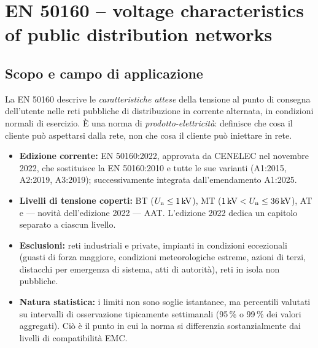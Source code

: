\chapter{EN 50160 -- voltage characteristics of public distribution networks}
\label{ch:en50160}
\begin{center}
\end{center}

\vspace{4mm}

\section{Scopo e campo di applicazione}

La EN 50160 descrive le \emph{caratteristiche attese} della tensione al punto di
consegna dell'utente nelle reti pubbliche di distribuzione in corrente alternata,
in condizioni normali di esercizio. È una norma di \emph{prodotto-elettricità}:
definisce che cosa il cliente può aspettarsi dalla rete, non che cosa il cliente
può iniettare in rete.

\begin{itemize}[itemsep=2pt]
  \item \textbf{Edizione corrente:} EN 50160:2022, approvata da CENELEC nel novembre 2022,
        che sostituisce la EN 50160:2010 e tutte le sue varianti
        (A1:2015, A2:2019, A3:2019); successivamente integrata dall'emendamento A1:2025.
  \item \textbf{Livelli di tensione coperti:} BT ($U_{\mathrm{n}} \le \SI{1}{kV}$),
        MT ($\SI{1}{kV} < U_{\mathrm{n}} \le \SI{36}{kV}$), AT e --- novità dell'edizione 2022 ---
        AAT. L'edizione 2022 dedica un capitolo separato a ciascun livello.
  \item \textbf{Esclusioni:} reti industriali e private, impianti in condizioni eccezionali
        (guasti di forza maggiore, condizioni meteorologiche estreme, azioni di terzi,
        distacchi per emergenza di sistema, atti di autorità), reti in isola non pubbliche.
  \item \textbf{Natura statistica:} i limiti non sono soglie istantanee, ma percentili
        valutati su intervalli di osservazione tipicamente settimanali
        (95\,\% o 99\,\% dei valori aggregati). Ciò è il punto in cui la norma si
        differenzia sostanzialmente dai livelli di compatibilità EMC.
\end{itemize}

